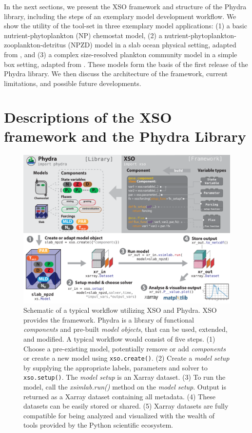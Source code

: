 \documentclass[gmd, manuscript]{copernicus}
\begin{document}
In the next sections, we present the XSO framework and structure of the Phydra library, including the steps of an exemplary model development workflow. We show the utility of the tool-set in three exemplary model applications: (1) a basic nutrient-phytoplankton (NP) chemostat model, (2) a nutrient-phytoplankton-zooplankton-detritus (NPZD) model in a slab ocean physical setting, adapted from \citet{Anderson2015c}, and (3) a complex size-resolved plankton community model in a simple box setting, adapted from \citet{Banas2011b}. These models form the basis of the first release of the Phydra library. We then discuss the architecture of the framework, current limitations, and possible future developments.


\section{Descriptions of the XSO framework and the Phydra Library} \label{Section:phydrapackage}
%
\begin{figure}[t]
\includegraphics[width=12cm]{Figures/firstdraft_schematics/00_schematics_Package.pdf}
\caption{Schematic of a typical workflow utilizing XSO and Phydra. XSO provides the framework. Phydra is a library of functional \textit{components} and pre-built \textit{model objects}, that can be used, extended, and modified. A typical workflow would consist of five steps. (1) Choose a pre-existing model, potentially remove or add \textit{components} or create a new model using \texttt{xso.create()}. (2) Create a \textit{model setup} by supplying the appropriate labels, parameters and solver to \texttt{xso.setup()}. The \textit{model setup} is an Xarray dataset. (3) To run the model, call the \textit{xsimlab.run()} method on the \textit{model setup}. Output is returned as a Xarray dataset containing all metadata. (4) These datasets can be easily stored or shared. (5) Xarray datasets are fully compatible for being analyzed and visualized with the wealth of tools provided by the Python scientific ecosystem.}
\label{Figure:PhydraXSOPackageSchematics}
\end{figure}
\end{document}
